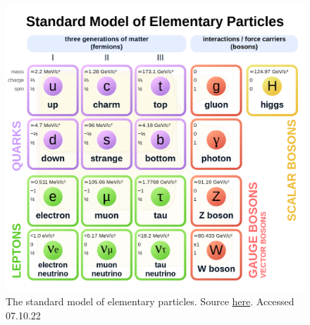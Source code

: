 
\begin{figure}[H]
    \includegraphics[width=\linewidth]{Figures/SM/Standard_Model_of_Elementary_Particles.svg.png}
    \caption[The Standard Model]{The standard model of elementary particles. Source \href{https://upload.wikimedia.org/wikipedia/commons/thumb/0/00/Standard_Model_of_Elementary_Particles.svg/1200px-Standard_Model_of_Elementary_Particles.svg.png}{here}. Accessed 07.10.22}
    \label{fig:smdiagram}
\end{figure}

